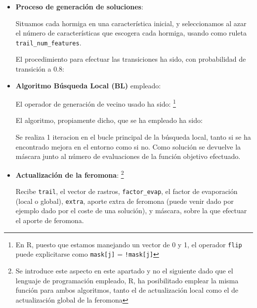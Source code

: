 \documentclass[a4paper,11pt]{article}
\begin{document}
\begin{itemize}
\begin{itemize}
    \small\texttt{}
    \normalsize  
  
  \item \textbf{Proceso de generación de soluciones}:
  
    \small\texttt{}
    \normalsize  
  
  Situamos cada hormiga en una característica inicial, y seleccionamos al azar el número de características que escogera
  cada hormiga, usando como ruleta \texttt{trail\_num\_features}.
  
  El procedimiento para efectuar las transiciones ha sido, con probabilidad de transición a 0.8: \\
  
    \small\texttt{}
    \normalsize  
  

  \item \textbf{Algoritmo Búsqueda Local (BL)} empleado:
  
  El operador de generación de vecino usado ha sido:
  \footnote{En R, puesto que estamos manejando un vector de 0 y 1, el operador \texttt{flip} puede explicitarse como
  \texttt{mask[j]} = \texttt{!mask[j]}}
  
  \small\texttt{}
  \normalsize
  
  
  El algoritmo, propiamente dicho, que se ha empleado ha sido:\\
  
  \small\texttt{}
  \normalsize
  
  Se realiza 1 iteracion en el bucle principal de la búsqueda local, tanto si se ha encontrado mejora en el entorno como
  si no. Como solución se devuelve la máscara junto al número de evaluaciones de la función objetivo efectuado.

  \item \textbf{Actualización de la feromona}:
  \footnote{Se introduce este aspecto en este apartado y no el siguiente dado que el lenguaje de programación empleado,
  R, ha posibilitado emplear la misma función para ambos algoritmos, tanto el de actualización local como el de actualización
  global de la feromona}
  
  \small\texttt{}
  
  Recibe \texttt{trail}, el vector de rastros, \texttt{factor\_evap}, el factor de evaporación (local o global), 
  \texttt{extra}, aporte extra de feromona (puede venir dado por ejemplo dado por el coste de una solución), y máscara,
  sobre la que efectuar el aporte de feromona.
  \normalsize
  
\end{itemize}

\end{itemize}
\end{document}
